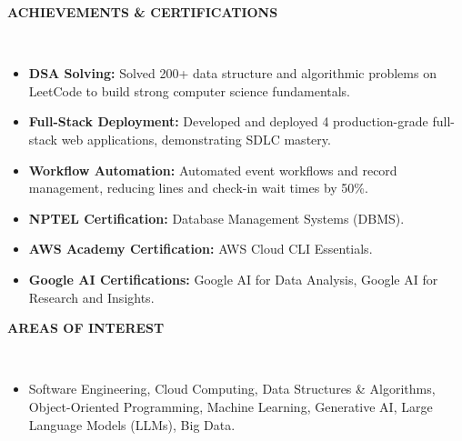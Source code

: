 \documentclass[a4paper,10pt]{article}
\newcommand{\isep}{-2 pt}
\newcommand{\lsep}{-0.5cm}
\newcommand{\resheading}[1]{{\small \colorbox{mygrey}{\begin{minipage}{0.975\textwidth}{\textbf{#1 \vphantom{p\^{E}}}}\end{minipage}}}}
\begin{document}
\resheading{\textbf{ACHIEVEMENTS \& CERTIFICATIONS} }\\[\lsep]
\begin{itemize}
\setlength\itemsep{\isep}
\item \textbf{DSA Solving:} Solved 200+ data structure and algorithmic problems on LeetCode to build strong computer science fundamentals.
\item \textbf{Full-Stack Deployment:} Developed and deployed 4 production-grade full-stack web applications, demonstrating SDLC mastery.
\item \textbf{Workflow Automation:} Automated event workflows and record management, reducing lines and check-in wait times by 50\%.
\item \textbf{NPTEL Certification:} Database Management Systems (DBMS).
\item \textbf{AWS Academy Certification:} AWS Cloud CLI Essentials.
\item \textbf{Google AI Certifications:} Google AI for Data Analysis, Google AI for Research and Insights.
\end{itemize}

\resheading{\textbf{AREAS OF INTEREST} }\\[\lsep]
\begin{itemize}
\setlength\itemsep{\isep}
\item Software Engineering, Cloud Computing, Data Structures \& Algorithms, Object-Oriented Programming, Machine Learning, Generative AI, Large Language Models (LLMs), Big Data.
\end{itemize}
\end{document}
